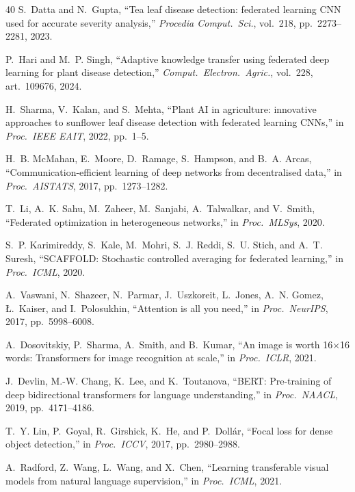\documentclass[12pt, a4paper, oneside]{Thesis}
\begin{document}
\begin{thebibliography}{40}
S.~Datta and N.~Gupta,
``Tea leaf disease detection: federated learning {CNN} used for accurate severity
analysis,''
\emph{Procedia Comput.\ Sci.}, vol.\ 218, pp.\ 2273--2281, 2023.

P.~Hari and M.~P. Singh,
``Adaptive knowledge transfer using federated deep learning for plant disease
detection,''
\emph{Comput.\ Electron.\ Agric.}, vol.\ 228, art.\ 109676, 2024.

H.~Sharma, V.~Kalan, and S.~Mehta,
``Plant {AI} in agriculture: innovative approaches to sunflower leaf disease
detection with federated learning {CNNs},''
in \emph{Proc.\ IEEE EAIT}, 2022, pp.\ 1--5.

H.~B. McMahan, E.~Moore, D.~Ramage, S.~Hampson, and B.~A. Arcas,
``Communication-efficient learning of deep networks from decentralised data,''
in \emph{Proc.\ AISTATS}, 2017, pp.\ 1273--1282.

T.~Li, A.~K. Sahu, M.~Zaheer, M.~Sanjabi, A.~Talwalkar, and V.~Smith,
``Federated optimization in heterogeneous networks,''
in \emph{Proc.\ MLSys}, 2020.

S.~P. Karimireddy, S.~Kale, M.~Mohri, S.~J. Reddi, S.~U. Stich, and A.~T. Suresh,
``SCAFFOLD: Stochastic controlled averaging for federated learning,''
in \emph{Proc.\ ICML}, 2020.

A.~Vaswani, N.~Shazeer, N.~Parmar, J.~Uszkoreit, L.~Jones, A.~N. Gomez, \L.~Kaiser,
and I.~Polosukhin,
``Attention is all you need,''
in \emph{Proc.\ NeurIPS}, 2017, pp.\ 5998--6008.

A.~Dosovitskiy, P.~Sharma, A.~Smith, and B.~Kumar,
``An image is worth 16$\times$16 words: Transformers for image recognition at scale,''
in \emph{Proc.\ ICLR}, 2021.

J.~Devlin, M.-W. Chang, K.~Lee, and K.~Toutanova,
``BERT: Pre-training of deep bidirectional transformers for language understanding,''
in \emph{Proc.\ NAACL}, 2019, pp.\ 4171--4186.

T.~Y. Lin, P.~Goyal, R.~Girshick, K.~He, and P.~Doll\'{a}r,
``Focal loss for dense object detection,''
in \emph{Proc.\ ICCV}, 2017, pp.\ 2980--2988.

A.~Radford, Z.~Wang, L.~Wang, and X.~Chen,
``Learning transferable visual models from natural language supervision,''
in \emph{Proc.\ ICML}, 2021.


\end{thebibliography}
\end{document}
